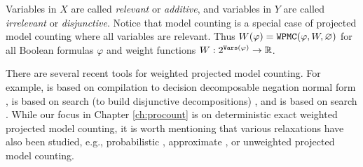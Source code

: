 Variables in $X$ are called \emph{relevant} or \emph{additive}, and variables in $Y$ are called \emph{irrelevant} or \emph{disjunctive}. 
Notice that model counting is a special case of projected model counting where all variables are relevant. Thus $W(\varphi) = \texttt{\upshape WPMC}(\varphi, W, \varnothing)$ for all Boolean formulas $\varphi$ and weight functions $W: 2^{\texttt{\upshape Vars}(\varphi)} \rightarrow \mathbb{R}$. 

There are several recent tools for weighted projected model counting.
For example, \dfp{} is based on compilation to decision decomposable negation normal form \cite{lagniez2019recursive}, \projmc{} is based on search (to build disjunctive decompositions) \cite{lagniez2019recursive}, and \ssat{} is based on search \cite{lee2017solving}. 
While our focus in Chapter \ref{ch:procount} is on deterministic exact weighted projected model counting, it is worth mentioning that various relaxations have also been studied, e.g., probabilistic \cite{sharma2019ganak}, approximate \cite{ermon2013taming,fremont2017maximum,soos2019bird}, or unweighted \cite{zawadzki2013generalization,aziz2015projected,mohle2018dualizing,hecher2020taming} projected model counting.